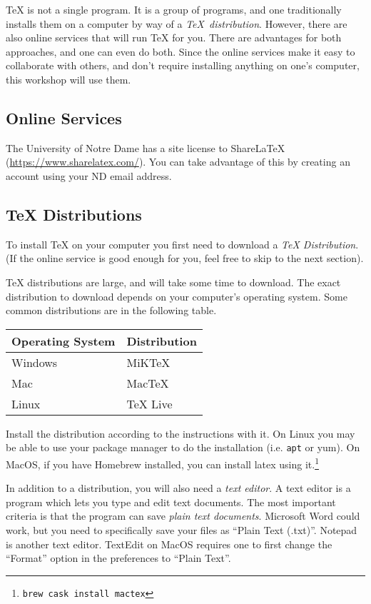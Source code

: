 \documentclass{article}
\begin{document}
TeX is not a single program.
It is a group of programs, and one traditionally installs them on a computer by way of a \textit{\TeX\ distribution}.
However, there are also online services that will run TeX for you.
There are advantages for both approaches, and one can even do both.
Since the online services make it easy to collaborate with others, and don't require installing
anything on one's computer, this workshop will use them.

\subsection{Online Services}

The University of Notre Dame has a site license to ShareLaTeX (\url{https://www.sharelatex.com/}).
You can take advantage of this by creating an account using your ND email address.

\subsection{TeX Distributions}
To install TeX on your computer you first need to download a \textit{TeX Distribution}.
(If the online service is good enough for you, feel free to skip to the next section).

TeX distributions are large, and will take some time to download.
The exact distribution to download depends on your computer's operating system.
Some common distributions are in the following table.

\begin{center}
\begin{tabular}{ll}
    \toprule
    Operating System & Distribution \\
    \midrule
    Windows & MiKTeX \\
    Mac & MacTeX \\
    Linux & TeX Live \\
    \bottomrule
\end{tabular}
\end{center}

Install the distribution according to the instructions with it.
On Linux you may be able to use your package manager to do the installation (i.e. \texttt{apt} or {yum}).
On MacOS, if you have Homebrew installed, you can install latex using it.\footnote{\texttt{brew cask install mactex}}

In addition to a distribution, you will also need a \textit{text editor}.
A text editor is a program which lets you type and edit text documents.
The most important criteria is that the program can save \textit{plain text documents}.
Microsoft Word could work, but you need to specifically save your files as ``Plain Text (.txt)''.
Notepad is another text editor.
TextEdit on MacOS requires one to first change the ``Format'' option in the preferences to ``Plain Text''.
\end{document}
